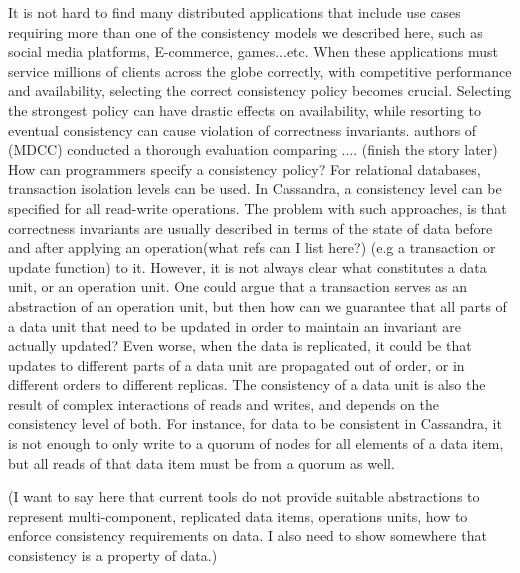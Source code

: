 It is not hard to find many distributed applications that include use cases
requiring more than one of the consistency models we described here, such as social media
platforms, E-commerce, games...etc. When these applications must service millions of
clients across the globe correctly, with competitive performance and
availability, selecting the correct consistency policy becomes crucial.
Selecting the strongest policy can have drastic effects on availability, while
resorting to eventual consistency can cause violation of correctness invariants.
authors of (MDCC) conducted a thorough evaluation comparing .... (finish the
story later)
\\

How can programmers specify a consistency policy? For relational databases,
transaction isolation levels can be used. In Cassandra, a consistency level can
be specified for all read-write operations. The problem with such approaches, is
that correctness invariants are usually described in terms of the state of data
before and after applying an operation(what refs can I list here?) 
(e.g a transaction or update function) to
it. However, it is not always clear what constitutes a data unit, or an
operation unit. One could argue that a transaction serves as an abstraction of
an operation unit, but then how can we guarantee that all parts of a data unit
that need to be updated in order to maintain an invariant are actually updated?
Even worse, when the data is replicated, it could be that updates to different
parts of a data unit are propagated out of order, or in different orders to
different replicas. The consistency of a data unit is also the result of complex
interactions of reads and writes, and depends on the consistency level of both.
For instance, for data to be consistent in Cassandra, it is not enough to only
write to a quorum of nodes for all elements of a data item, but all reads of
that data item must be from a quorum as well. 

(I want to say here that current tools do not provide suitable abstractions to
represent multi-component, replicated data items, operations units, how to
enforce consistency requirements on data. I also need to show somewhere that
consistency is a property of data.)\\

